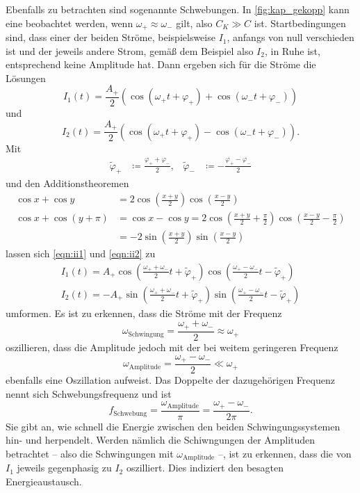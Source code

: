 Ebenfalls zu betrachten sind sogenannte Schwebungen. 
In \ref{fig:kap_gekopp} kann eine beobachtet werden, wenn ${\omega _+ \approx \omega _-}$ gilt, also 
${C_K \gg C}$ ist. 
Startbedingungen sind, dass einer der beiden Ströme, beispielsweise $I_1$, anfangs von null verschieden ist und der 
jeweils andere Strom, gemäß dem Beispiel also $I_2$, in Ruhe ist, entsprechend keine Amplitude hat. 
Dann ergeben sich für die Ströme die Lösungen 
\begin{equation}
    I_1 (t) = \frac{A_+}{2} ( \cos(\omega _+ t + \varphi _+) + \cos(\omega _- t + \varphi _-))
    \label{eqn:ii1}
\end{equation}
und 
\begin{equation}
    I_2 (t) = \frac{A_+}{2} ( \cos(\omega _+ t + \varphi _+) - \cos(\omega _- t + \varphi _-)) .
    \label{eqn:ii2}
\end{equation}
Mit 
\begin{align}
    \tilde{\varphi}_+ &\coloneq \frac{\varphi _+ + \varphi _-}{2} ,
    & \tilde{\varphi}_- &\coloneq - \frac{\varphi _+ - \varphi _-}{2}
\end{align}
und den Additionstheoremen 
\begin{align}
    \cos x + \cos y &= 2 \cos(\frac{x+y}{2}) \cos(\frac{x-y}{2}) \\
    \cos x + \cos(y + \pi) &= \cos x - \cos y = 2 \cos(\frac{x+y}{2} + \frac{\pi}{2}) \cos(\frac{x-y}{2} - \frac{\pi}{2}) \\
        &=-2  \sin(\frac{x+y}{2}) \sin(\frac{x-y}{2})
\end{align}
lassen sich \ref{eqn:ii1} und \ref{eqn:ii2} zu 
\begin{gather}
    I_1 (t)= A_+ \cos(\frac{\omega _+ + \omega _-}{2}t +\tilde{\varphi}_+) \cos(\frac{\omega _+ - \omega _-}{2}t -\tilde{\varphi}_+) \\
    I_2 (t)=-A_+ \sin(\frac{\omega _+ + \omega _-}{2}t +\tilde{\varphi}_+) \sin(\frac{\omega _+ - \omega _-}{2}t -\tilde{\varphi}_+)
\end{gather}
umformen.
Es ist zu erkennen, dass die Ströme mit der Frequenz 
\begin{equation}
    \omega _\text{Schwingung} = \frac{\omega _+ + \omega _-}{2} \approx \omega _+
\end{equation}
oszillieren, dass die Amplitude jedoch mit der bei weitem geringeren Frequenz 
\begin{equation}
    \omega _\text{Amplitude} = \frac{\omega _+ - \omega _-}{2} \ll \omega _+
\end{equation} 
ebenfalls eine Oszillation aufweist. 
Das Doppelte der dazugehörigen Frequenz nennt sich Schwebungsfrequenz und ist 
\begin{equation}
    f_\text{Schwebung}= \frac{\omega _\text{Amplitude}}{\pi}=\frac{\omega _+ - \omega _-}{2 \pi}.
\end{equation} 
Sie gibt an, wie schnell die Energie zwischen den beiden Schwingungssystemen hin- und herpendelt. 
Werden nämlich die Schiwngungen der Amplituden betrachtet -- also die Schwingungen mit $\omega _\text{Amplitude}$ --, 
ist zu erkennen, dass die von $I_1$ jeweils gegenphasig zu $I_2$ oszilliert. 
Dies indiziert den besagten Energieaustausch. 
\FloatBarrier

